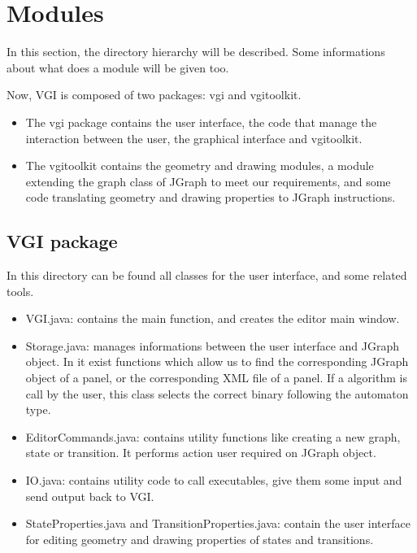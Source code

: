 \section{Modules}

In this section, the directory hierarchy will be described. Some
informations about what does a module will be given too.

Now, VGI is composed of two packages: vgi and vgitoolkit.
\begin{itemize}
\item The vgi package contains the user interface, the code that manage the
interaction between the user, the graphical interface and vgitoolkit.

\item The vgitoolkit contains the geometry and drawing modules, a module
extending the graph class of JGraph to meet our requirements, and some
code translating geometry and drawing properties to JGraph
instructions.
\end{itemize}


\subsection[src/vgi]{VGI package}

In this directory can be found all classes for the user interface, and
some related tools.

\begin{itemize}
\item VGI.java: contains the main function, and creates the editor
  main window.

\item Storage.java: manages informations between the user interface
  and JGraph object. In it exist functions which allow us to find the
  corresponding JGraph object of a panel, or the corresponding XML
  file of a panel. If a algorithm is call by the user, this class
  selects the correct binary following the automaton type.

\item EditorCommands.java: contains utility functions like creating a
  new graph, state or transition. It performs action user required on
  JGraph object.

\item IO.java: contains utility code to call executables, give them
  some input and send output back to VGI.

\item StateProperties.java and TransitionProperties.java: contain the
  user interface for editing geometry and drawing properties of states
  and transitions.
\end{itemize}


